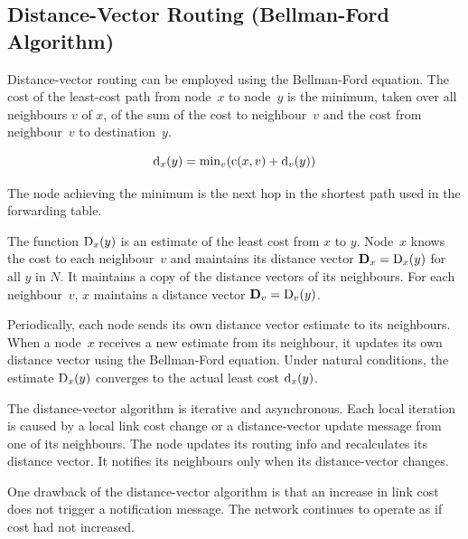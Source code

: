 \subsection{Distance-Vector Routing (Bellman-Ford Algorithm)}

Distance-vector routing can be employed using the Bellman-Ford equation.
The cost of the least-cost path from node~\(x\) to node~\(y\) is the minimum, taken over all neighbours \(v\) of \(x\), of the sum of the cost to neighbour~\(v\) and the cost from neighbour~\(v\) to destination~\(y\).

\begin{equation*}
  \textup{d}_{x}\!\left( y \right) = \textup{min}_{v}\!\left( \textup{c}\!\left( x, v \right) + \textup{d}_{v}\!\left( y \right) \right)
\end{equation*}

The node achieving the minimum is the next hop in the shortest path used in the forwarding table.

The function \(\textup{D}_{x}\!\left( y \right)\) is an estimate of the least cost from \(x\) to \(y\).
Node~\(x\) knows the cost to each neighbour~\(v\) and maintains its distance vector \(\mathbf{D}_x = \textup{D}_{x}\!\left( y \right)\) for all \(y\) in \(N\).
It maintains a copy of the distance vectors of its neighbours.
For each neighbour~\(v\), \(x\) maintains a distance vector \(\mathbf{D}_v = \textup{D}_{v}\!\left( y \right)\).

Periodically, each node sends its own distance vector estimate to its neighbours.
When a node~\(x\) receives a new estimate from its neighbour, it updates its own distance vector using the Bellman-Ford equation.
Under natural conditions, the estimate \(\textup{D}_{x}\!\left( y \right)\) converges to the actual least cost \(\textup{d}_{x}\!\left( y \right)\).

The distance-vector algorithm is iterative and asynchronous.
Each local iteration is caused by a local link cost change or a distance-vector update message from one of its neighbours.
The node updates its routing info and recalculates its distance vector.
It notifies its neighbours only when its distance-vector changes.

One drawback of the distance-vector algorithm is that an increase in link cost does not trigger a notification message.
The network continues to operate as if cost had not increased.

